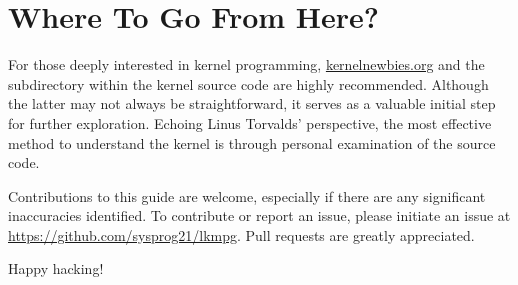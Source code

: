 \documentclass[10pt, oneside]{book}
\begin{document}
\section{Where To Go From Here?}
\label{sec:where_to_go}
For those deeply interested in kernel programming,
\href{https://kernelnewbies.org}{kernelnewbies.org} and the  subdirectory within the kernel source code are highly recommended.
Although the latter may not always be straightforward, it serves as a valuable initial step for further exploration.
Echoing Linus Torvalds' perspective, the most effective method to understand the kernel is through personal examination of the source code.

Contributions to this guide are welcome, especially if there are any significant inaccuracies identified.
To contribute or report an issue, please initiate an issue at \url{https://github.com/sysprog21/lkmpg}.
Pull requests are greatly appreciated.

Happy hacking!
\end{document}

